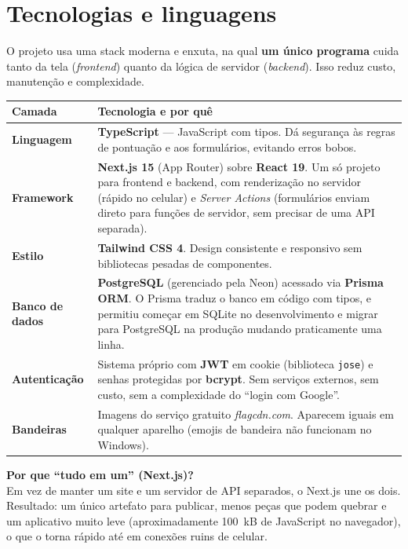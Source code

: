 \documentclass[11pt,a4paper]{article}
\newcommand{\caixa}[2]{%
  \par\medskip\noindent
  \colorbox{verdeclaro}{\begin{minipage}{\dimexpr\linewidth-2\fboxsep}
  \textbf{\color{verde}#1}\\[0.3em]#2
  \end{minipage}}\par\medskip}
\begin{document}
\section{Tecnologias e linguagens}

O projeto usa uma stack moderna e enxuta, na qual \textbf{um único programa}
cuida tanto da tela (\textit{frontend}) quanto da lógica de servidor
(\textit{backend}). Isso reduz custo, manutenção e complexidade.

\begin{center}
\begin{tabularx}{\textwidth}{@{}>{\bfseries}p{3.6cm} L@{}}
\toprule
Camada & Tecnologia e por quê \\
\midrule
Linguagem & \textbf{TypeScript} --- JavaScript com tipos. Dá segurança às
regras de pontuação e aos formulários, evitando erros bobos. \\[4pt]
Framework & \textbf{Next.js 15} (App Router) sobre \textbf{React 19}. Um só
projeto para frontend e backend, com renderização no servidor (rápido no
celular) e \textit{Server Actions} (formulários enviam direto para funções de
servidor, sem precisar de uma API separada). \\[4pt]
Estilo & \textbf{Tailwind CSS 4}. Design consistente e responsivo sem
bibliotecas pesadas de componentes. \\[4pt]
Banco de dados & \textbf{PostgreSQL} (gerenciado pela Neon) acessado via
\textbf{Prisma ORM}. O Prisma traduz o banco em código com tipos, e permitiu
começar em SQLite no desenvolvimento e migrar para PostgreSQL na produção
mudando praticamente uma linha. \\[4pt]
Autenticação & Sistema próprio com \textbf{JWT} em cookie (biblioteca
\texttt{jose}) e senhas protegidas por \textbf{bcrypt}. Sem serviços externos,
sem custo, sem a complexidade do ``login com Google''. \\[4pt]
Bandeiras & Imagens do serviço gratuito \textit{flagcdn.com}. Aparecem iguais
em qualquer aparelho (emojis de bandeira não funcionam no Windows). \\
\bottomrule
\end{tabularx}
\end{center}

\caixa{Por que ``tudo em um'' (Next.js)?}{Em vez de manter um site e um servidor
de API separados, o Next.js une os dois. Resultado: um único artefato para
publicar, menos peças que podem quebrar e um aplicativo muito leve
(aproximadamente 100~kB de JavaScript no navegador), o que o torna rápido até
em conexões ruins de celular.}
\end{document}
